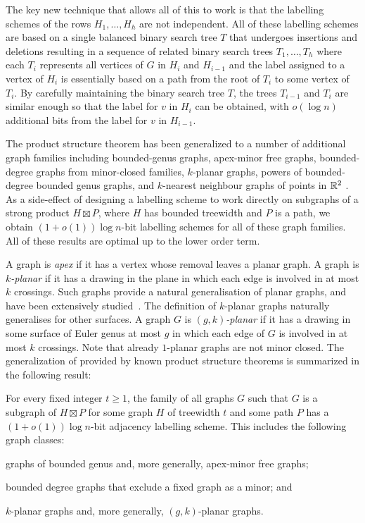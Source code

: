 \documentclass[10pt, conference, compsocconf]{IEEEtran}
\let\geq\geqslant
\begin{document}
The key new technique that allows all of this to work is that the labelling schemes of the rows $H_1,\dots,H_h$ are not independent.  All of these labelling schemes are based on a single balanced binary search tree $T$ that undergoes insertions and deletions resulting in a sequence of related binary search trees $T_1,\dots,T_h$ where each $T_i$ represents all vertices of $G$ in $H_{i}$ and $H_{i-1}$ and the label assigned to a vertex of $H_i$ is essentially based on a path from the root of $T_i$ to some vertex of $T_i$.  By carefully maintaining the binary search tree $T$, the trees $T_{i-1}$ and $T_{i}$ are similar enough so that the label for $v$ in $H_i$ can be obtained, with $o(\log n)$ additional bits from the label for $v$ in $H_{i-1}$.

The product structure theorem has been generalized to a number of additional graph families including bounded-genus graphs, apex-minor free graphs, bounded-degree graphs from minor-closed families, $k$-planar graphs, powers of bounded-degree bounded genus graphs, and $k$-nearest neighbour graphs of points in $\mathbb{R}^2$ \cite{dujmovic.joret.ea:planar,dujmovic.morin.ea:structure}. As a side-effect of designing a labelling scheme to work directly on subgraphs of a strong product $H\boxtimes P$, where $H$ has bounded treewidth and $P$ is a path,
we obtain $(1+o(1))\log n$-bit labelling schemes for all of these graph families.  All of these results are optimal up to the lower order term.

A graph is \emph{apex} if it has a vertex whose removal leaves a planar graph.
A graph is \emph{$k$-planar} if it has a drawing in the plane in which
each edge is involved in at most $k$ crossings. Such graphs provide a natural
generalisation of planar graphs, and have been extensively studied~\cite{kobourov.liotta.ea:annotated}.
The definition of $k$-planar graphs naturally generalises for other surfaces. A graph $G$ is
\emph{$(g,k)$-planar} if it has a drawing in some surface of Euler genus at most
$g$ in which each edge of $G$ is involved in at most $k$ crossings.
Note that already $1$-planar graphs are not minor closed.
The generalization of  provided by known product structure theorems is summarized in the following result:

\begin{thm}
  For every fixed integer $t\geq 1$, the family of all graphs $G$ such that $G$ is a subgraph of $H\boxtimes P$ for some graph $H$ of treewidth $t$ and some path $P$ has a $(1+o(1))\log n$-bit adjacency labelling scheme.
  This includes the following graph classes:
  \begin{compactenum}
    \item graphs of bounded genus and, more generally, apex-minor free graphs;
    \item bounded degree graphs that exclude a fixed graph as a minor; and
    \item $k$-planar graphs and, more generally, $(g,k)$-planar graphs.
  \end{compactenum}
\end{thm}
\end{document}
